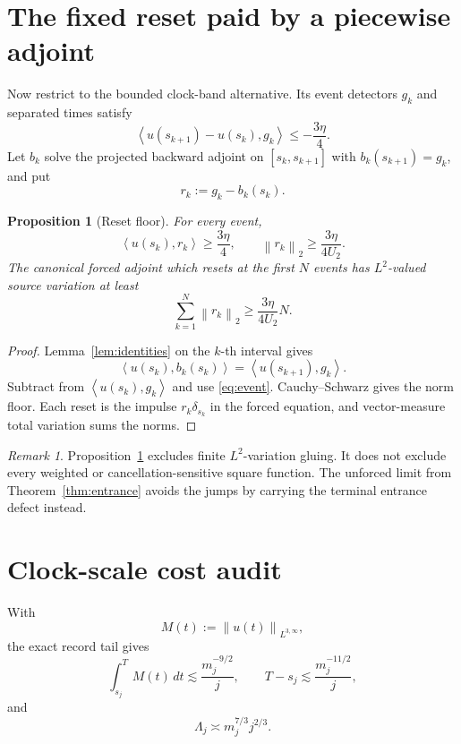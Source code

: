 \documentclass[11pt]{article}
\newtheorem{proposition}[theorem]{Proposition}
\theoremstyle{remark}
\newtheorem{remark}[theorem]{Remark}
\newcommand{\ip}[2]{\left\langle #1,#2\right\rangle}
\newcommand{\norm}[1]{\left\|#1\right\|}
\begin{document}
\section{The fixed reset paid by a piecewise adjoint}

Now restrict to the bounded clock-band alternative.  Its event detectors
\(g_k\) and separated times satisfy
\begin{equation}
 \label{eq:event}
 \ip{u(s_{k+1})-u(s_k)}{g_k}
 \leq-\frac{3\eta}{4}.
\end{equation}
Let \(b_k\) solve the projected backward adjoint on
\([s_k,s_{k+1}]\) with \(b_k(s_{k+1})=g_k\), and put
\[
 r_k:=g_k-b_k(s_k).
\]

\begin{proposition}[Reset floor]
\label{prop:reset}
For every event,
\begin{equation}
 \label{eq:reset-floor}
 \boxed{
 \ip{u(s_k)}{r_k}\geq\frac{3\eta}{4},
 \qquad
 \norm{r_k}_2\geq\frac{3\eta}{4U_2}.
 }
\end{equation}
The canonical forced adjoint which resets at the first \(N\) events has
\(L^2\)-valued source variation at least
\begin{equation}
 \label{eq:variation}
 \sum_{k=1}^N\norm{r_k}_2
 \geq
 \frac{3\eta}{4U_2}N.
\end{equation}
\end{proposition}

\begin{proof}
Lemma~\ref{lem:identities} on the \(k\)-th interval gives
\[
 \ip{u(s_k)}{b_k(s_k)}
 =
 \ip{u(s_{k+1})}{g_k}.
\]
Subtract from \(\ip{u(s_k)}{g_k}\) and use \eqref{eq:event}.
Cauchy--Schwarz gives the norm floor.  Each reset is the impulse
\(r_k\delta_{s_k}\) in the forced equation, and vector-measure total
variation sums the norms.
\end{proof}

\begin{remark}
Proposition~\ref{prop:reset} excludes finite \(L^2\)-variation gluing.
It does not exclude every weighted or cancellation-sensitive square
function.  The unforced limit from Theorem~\ref{thm:entrance} avoids the
jumps by carrying the terminal entrance defect instead.
\end{remark}

\section{Clock-scale cost audit}

With
\[
 M(t):=\norm{u(t)}_{L^{3,\infty}},
\]
the exact record tail gives
\begin{equation}
 \label{eq:tails}
 \int_{s_j}^TM(t)\,dt
 \lesssim
 \frac{m_j^{-9/2}}{j},
 \qquad
 T-s_j
 \lesssim
 \frac{m_j^{-11/2}}{j},
\end{equation}
and
\begin{equation}
 \label{eq:clock}
 \Lambda_j\asymp m_j^{7/3}j^{2/3}.
\end{equation}
\end{document}
